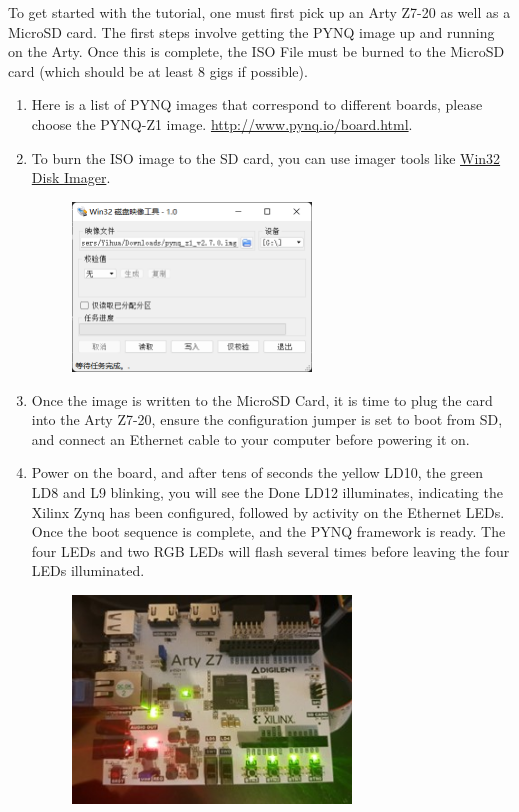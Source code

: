 \documentclass[a4paper,12pt,twoside]{article}
\begin{document}
To get started with the tutorial, one must first pick up an Arty Z7-20 as well as a MicroSD card. The first steps involve getting the PYNQ image up and running on the Arty. Once this is complete, the ISO File must be burned to the MicroSD card (which should be at least 8 gigs if possible).
\begin{enumerate}
    \item Here is a list of PYNQ images that correspond to different boards, please choose the PYNQ-Z1 image. \url{http://www.pynq.io/board.html}.
    \item To burn the ISO image to the SD card, you can use imager tools like \href{https://sourceforge.net/projects/win32diskimager/}{Win32 Disk Imager}.
    \begin{figure}[H]
        \centering
        \includegraphics[width=0.6\textwidth]{images/6.png}
    \end{figure}
    \item Once the image is written to the MicroSD Card, it is time to plug the card into the Arty Z7-20, ensure the configuration jumper is set to boot from SD, and connect an Ethernet cable to your computer before powering it on.
    \item Power on the board, and after tens of seconds the yellow LD10, the green LD8 and L9 blinking, you will see the Done LD12 illuminates, indicating the Xilinx Zynq has been configured, followed by activity on the Ethernet LEDs. Once the boot sequence is complete, and the PYNQ framework is ready. The four LEDs and two RGB LEDs will flash several times before leaving the four LEDs illuminated.
    \begin{figure}[H]
        \centering
        \includegraphics[width=0.7\textwidth]{images/7.jpg}

\end{figure}
\end{enumerate}
\end{document}
